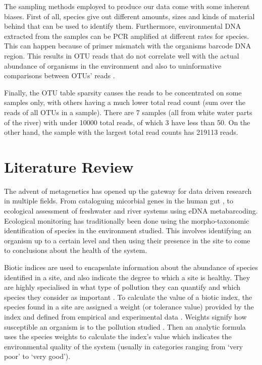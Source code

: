 The sampling methods employed to produce our data come with some inherent biases. First of all, species give out different amounts, sizes and kinds of material behind that can be used to identify them. Furthermore, environmental DNA extracted from the samples can be PCR amplified at different rates for species. This can happen because of primer mismatch with the organisms barcode DNA region. This results in OTU reads that do not correlate well with the actual abundance of organisms in the environment and also to uninformative comparisons between OTUs' reads \cite{abundance_nodate}. 

Finally, the OTU table sparsity causes the reads to be concentrated on some samples only, with others having a much lower total read count (sum over the reads of all OTUs in a sample). There are 7 samples (all from white water parts of the river) with under 10000 total reads, of which 3 have less than 50. On the other hand, the sample with the largest total read counts has 219113 reads. 



\section{Literature Review}
The advent of metagenetics has opened up the gateway for data driven research in multiple fields. From cataloguing micorbial genes in the human gut \cite{dos_santos_human_2010}, to ecological assessment of freshwater \cite{apotheloz-perret-gentil_taxonomy-free_2017} and river systems \cite{chariton_ecological_2010} using eDNA metabarcoding. Ecological monitoring has traditionally been done using the morpho-taxonomic identification of species in the environment studied. This involves identifying an organism up to a certain level and then using their presence in the site to come to conclusions about the health of the system.


Biotic indices are used to encapsulate information about the abundance of species identified in a site, and also indicate the degree to which a site is healthy. They are highly specialised in what type of pollution they can quantify and which species they consider as important \cite{washington_diversity_1984}. To calculate the value of a biotic index, the species found in a site are assigned a weight (or tolerance value) provided by the index and defined from empirical and experimental data \cite{borja_marine_2000}. Weights signify how susceptible an organism is to the pollution studied \cite{carter_chapter_2017}. Then an analytic formula uses the species weights to calculate the index's value which indicates the environmental quality of the system (usually in categories ranging from `very poor' to `very good').

